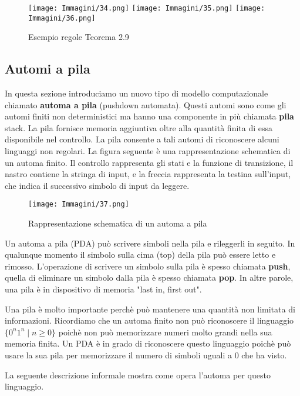 \documentclass{article}
\begin{document}
\begin{figure}[H]
    \centering
    \texttt{[image: Immagini/34.png]}
    \texttt{[image: Immagini/35.png]}
    \texttt{[image: Immagini/36.png]}
    \caption{Esempio regole Teorema 2.9}
    \label{fig:your_image}
\end{figure}

\subsection{Automi a pila}
In questa sezione introduciamo un nuovo tipo di modello computazionale chiamato \textbf{automa a pila} (pushdown automata). Questi automi sono come gli automi finiti non deterministici ma hanno una componente in più chiamata \textbf{pila} stack. La pila fornisce memoria aggiuntiva oltre alla quantità finita di essa disponibile nel controllo. La pila consente a tali automi di riconoscere alcuni linguaggi non regolari.
La figura seguente è una rappresentazione schematica di un automa finito. Il controllo rappresenta gli stati e la funzione di transizione, il nastro contiene la stringa di input, e la freccia rappresenta la testina sull'input, che indica il successivo simbolo di input da leggere.
\begin{figure}[H]
    \centering
    \texttt{[image: Immagini/37.png]}
    \caption{Rappresentazione schematica di un automa a pila}
    \label{fig:pushdown_automaton1}
\end{figure}
Un automa a pila (PDA) può scrivere simboli nella pila e rileggerli in seguito. In qualunque momento il simbolo sulla cima (top) della pila può essere letto e rimosso.
L'operazione di scrivere un simbolo sulla pila è spesso chiamata \textbf{push}, quella di eliminare un simbolo dalla pila è spesso chiamata \textbf{pop}.
In altre parole, una pila è in dispositivo di memoria "last in, first out".

Una pila è molto importante perchè può mantenere una quantità non limitata di informazioni. Ricordiamo che un automa finito non può riconoscere il linguaggio $\{0^n 1^n \mid n \geq 0\}$ poichè non può memorizzare numeri molto grandi nella sua memoria finita. Un PDA è in grado di riconoscere questo linguaggio poichè può usare la sua pila per memorizzare il numero di simboli uguali a 0 che ha visto.

La seguente descrizione informale mostra come opera l'automa per questo linguaggio.
\vspace{1em}
\end{document}

